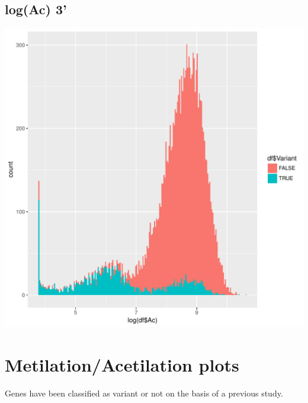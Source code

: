 \documentclass{article}\usepackage[]{graphicx}\usepackage[]{color}
\newenvironment{knitrout}{}{} %
\begin{document}
\subsection{log(Ac) 3'}
\begin{knitrout}
\color{fgcolor}
\includegraphics[width=1\linewidth]{figure/dens_3_met-1} 

\end{knitrout}

\section{Metilation/Acetilation plots}

Genes have been classified as variant or not on the basis of a previous study.
\end{document}
